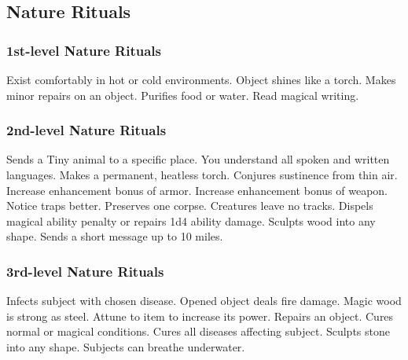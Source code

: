 \subsection{Nature Rituals}\label{Nature Rituals}

\subsubsection{1st-level Nature Rituals}
\begin{rituallist}
     Exist comfortably in hot or cold environments.
     Object shines like a torch.
     Makes minor repairs on an object.
     Purifies food or water.
     Read magical writing.
\end{rituallist}

\subsubsection{2nd-level Nature Rituals}
\begin{rituallist}
     Sends a Tiny animal to a specific place.
     You understand all spoken and written languages.
     Makes a permanent, heatless torch.
     Conjures sustinence from thin air.
     Increase enhancement bonus of armor.
     Increase enhancement bonus of weapon.
     Notice traps better.
     Preserves one corpse.
     Creatures leave no tracks.
     Dispels magical ability penalty or repairs 1d4 ability damage.
     Sculpts wood into any shape.
     Sends a short message up to 10 miles.
\end{rituallist}

\subsubsection{3rd-level Nature Rituals}
\begin{rituallist}
     Infects subject with chosen disease.
     Opened object deals fire damage.
     Magic wood is strong as steel.
     Attune to item to increase its power.
     Repairs an object.
     Cures normal or magical conditions.
     Cures all diseases affecting subject.
     Sculpts stone into any shape.
     Subjects can breathe underwater.
\end{rituallist}

